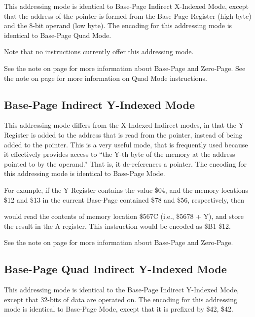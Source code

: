This addressing mode is identical to Base-Page Indirect X-Indexed Mode, except that the address
of the pointer is formed from the Base-Page Register (high byte) and the 8-bit operand (low byte).
The encoding for this addressing mode is identical to Base-Page Quad Mode.

Note that no instructions currently offer this addressing mode.

See the note on page \pageref{Base-Page (Zero-Page) Mode} for more information about Base-Page and Zero-Page.
See the note on page \pageref{Base-Page (Zero-Page) Quad Mode} for more information on Quad Mode instructions.
\fi

\subsection{Base-Page Indirect Y-Indexed Mode}

This addressing mode differs from the X-Indexed Indirect modes, in that the Y Register is
added to the address that is read from the pointer, instead of being added to the pointer.
This is a very useful mode, that is frequently used because it effectively provides access to
``the Y-th byte of the memory at the address pointed to by the operand.'' That is, it de-references
a pointer.
The encoding for this addressing mode is identical to Base-Page Mode.

For example, if the Y Register contains the value \$04, and the memory locations \$12 and \$13 in the current
Base-Page contained \$78 and \$56, respectively,
then


would read the contents of memory location \$567C (i.e., \$5678 + Y),
and store the result in the A register. This instruction would be encoded as \$B1 \$12.

See the note on page \pageref{Base-Page (Zero-Page) Mode} for more information about Base-Page and Zero-Page.

\iffalse
\subsection{Base-Page Quad Indirect Y-Indexed Mode}

This addressing mode is identical to the Base-Page Indirect Y-Indexed Mode, except that
32-bits of data are operated on. The encoding for this addressing mode is identical to
Base-Page Mode, except that it is prefixed by \$42, \$42.

